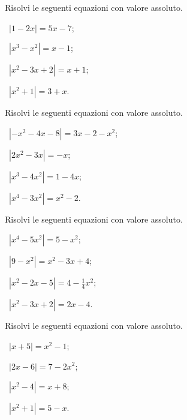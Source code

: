 \begin{esercizio}[\Ast]
 \label{ese:7.10}
Risolvi le seguenti equazioni con valore assoluto.
\begin{multicols}{2}
 \begin{enumeratea}
 \item~$\left|1-2x\right|=5x-7$;
 \item~$\left|x^3-x^2\right|=x-1$;
 \item~$\left|x^2-3x+2\right|=x+1$;
 \item~$\left|x^2+1\right|=3+x$.
 \end{enumeratea}
 \end{multicols}
\end{esercizio}

\begin{esercizio}[\Ast]
 \label{ese:7.11}
Risolvi le seguenti equazioni con valore assoluto.
\begin{multicols}{2}
 \begin{enumeratea}
 \item~$\left|-x^2-4x-8\right|=3x-2-x^2$;
 \item~$\left|2x^2-3x\right|=-x$;
 \item~$\left|x^3-4x^2\right|=1-4x$;
 \item~$\left|x^4-3x^2\right|=x^2-2$.
 \end{enumeratea}
 \end{multicols}
\end{esercizio}

\begin{esercizio}[\Ast]
 \label{ese:7.12}
Risolvi le seguenti equazioni con valore assoluto.
\begin{multicols}{2}
 \begin{enumeratea}
 \item~$\left|x^4-5x^2\right|=5-x^2$;
 \item~$\left|9-x^2\right|=x^2-3x+4$;
 \item~$\left|x^2-2x-5\right|=4-\frac 1 4x^2$;
 \item~$\left|x^2-3x+2\right|=2x-4$.
 \end{enumeratea}
 \end{multicols}
\end{esercizio}

\begin{esercizio}[\Ast]
 \label{ese:7.13}
Risolvi le seguenti equazioni con valore assoluto.
\begin{multicols}{2}
 \begin{enumeratea}
 \item~$\left|x+5\right|=x^2-1$;
 \item~$\left|2x-6\right|=7-2x^2$;
 \item~$\left|x^2-4\right|=x+8$;
 \item~$\left|x^2+1\right|=5-x$.
 \end{enumeratea}
 \end{multicols}
\end{esercizio}

